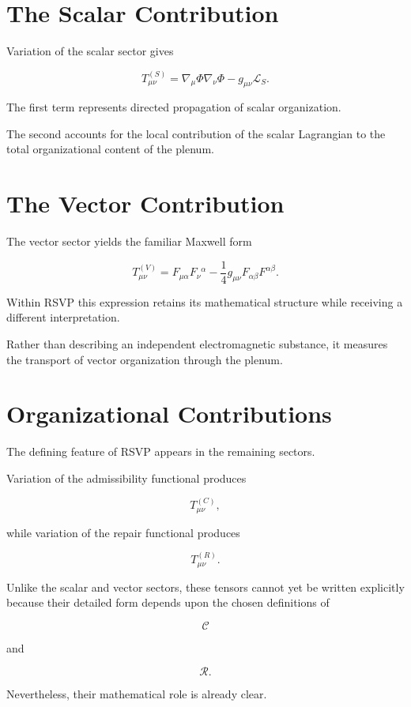 \documentclass[11pt,oneside]{book}
\numberwithin{equation}{chapter}
\theoremstyle{definition}
\theoremstyle{plain}
\begin{document}
\section{The Scalar Contribution}

Variation of the scalar sector gives

\[
\boxed{
T^{(S)}_{\mu\nu}
=
\nabla_\mu\Phi
\nabla_\nu\Phi
-
g_{\mu\nu}
\mathcal L_S.
}
\]

The first term represents directed propagation of scalar organization.

The second accounts for the local contribution of the scalar Lagrangian to
the total organizational content of the plenum.

\section{The Vector Contribution}

The vector sector yields the familiar Maxwell form

\[
\boxed{
T^{(V)}_{\mu\nu}
=
F_{\mu\alpha}
F_{\nu}{}^{\alpha}
-
\frac14
g_{\mu\nu}
F_{\alpha\beta}
F^{\alpha\beta}.
}
\]

Within RSVP this expression retains its mathematical structure while
receiving a different interpretation.

Rather than describing an independent electromagnetic substance, it measures
the transport of vector organization through the plenum.

\section{Organizational Contributions}

The defining feature of RSVP appears in the remaining sectors.

Variation of the admissibility functional produces

\[
T^{(C)}_{\mu\nu},
\]

while variation of the repair functional produces

\[
T^{(R)}_{\mu\nu}.
\]

Unlike the scalar and vector sectors, these tensors cannot yet be written
explicitly because their detailed form depends upon the chosen definitions
of

\[
\mathcal C
\]

and

\[
\mathcal R.
\]

Nevertheless, their mathematical role is already clear.
\end{document}
